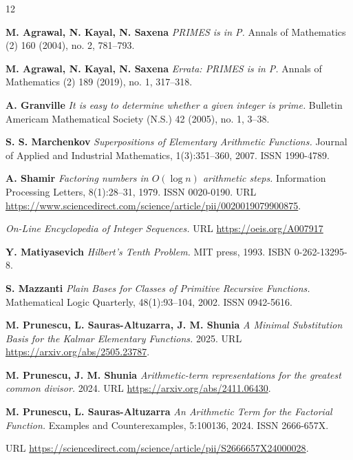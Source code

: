 \documentclass[10pt]{article}
\theoremstyle{plain}
\begin{document}
%
%

\begin{thebibliography}{12}

 {\bf M. Agrawal, N. Kayal, N. Saxena} {\it PRIMES is in P.} Annals of Mathematics (2) 160 (2004), no. 2, 781–793.

 {\bf M. Agrawal, N. Kayal, N. Saxena} {\it Errata: PRIMES is in P.} Annals of Mathematics (2) 189 (2019), no. 1, 317–318.

 {\bf A. Granville} {\it  It is easy to determine whether a given integer is prime.} Bulletin Americam Mathematical Society (N.S.) 42 (2005), no. 1, 3–38.

 {\bf S. S. Marchenkov} {\it Superpositions of Elementary Arithmetic Functions.} Journal of Applied and
Industrial Mathematics, 1(3):351–360, 2007. ISSN 1990-4789.

 {\bf A. Shamir} {\it Factoring numbers in $O(\log n)$ arithmetic steps.} Information Processing Letters, 8(1):28–31, 1979. ISSN 0020-0190.
URL \url{https://www.sciencedirect.com/science/article/pii/0020019079900875}.

 {\it On-Line Encyclopedia of Integer Sequences.} URL \url{https://oeis.org/A007917}

 {\bf Y. Matiyasevich} {\it Hilbert’s Tenth Problem.} MIT press, 1993. ISBN 0-262-13295-8.

 {\bf S. Mazzanti} {\it Plain Bases for Classes of Primitive Recursive Functions.} Mathematical Logic
Quarterly, 48(1):93–104, 2002. ISSN 0942-5616.

 {\bf M. Prunescu, L. Sauras-Altuzarra, J. M. Shunia} {\it A Minimal Substitution Basis for the Kalmar Elementary Functions.} 2025.
URL \url{https://arxiv.org/abs/2505.23787}.

 {\bf M. Prunescu, J. M. Shunia} {\it Arithmetic-term representations for the greatest common divisor.}
2024. URL \url{https://arxiv.org/abs/2411.06430}.

 {\bf M. Prunescu, L. Sauras-Altuzarra} {\it An Arithmetic Term for the Factorial Function.} Examples
and Counterexamples, 5:100136, 2024. ISSN 2666-657X.

URL
\url{https://sciencedirect.com/science/article/pii/S2666657X24000028}.


\end{thebibliography}
\end{document}

